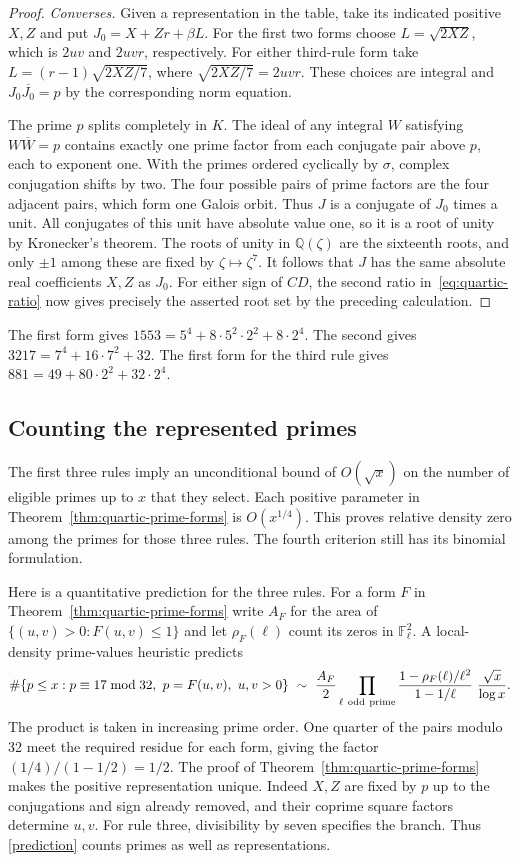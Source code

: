 \documentclass[11pt]{article}
\newcommand{\F}{\mathbb F}
\begin{document}
\begin{proof}
\smallskip\noindent
\emph{Converses.}
Given a representation in the table, take its indicated positive
$X,Z$ and put $J_0=X+Zr+\beta L$. For the first two forms choose
$L=\sqrt{2XZ}$, which is $2uv$ and $2uvr$, respectively.
For either third-rule form take $L=(r-1)\sqrt{2XZ/7}$, where
$\sqrt{2XZ/7}=2uvr$. These choices are integral and
$J_0\overline{J_0}=p$ by the corresponding norm equation.

The prime $p$ splits completely in $K$. The ideal of any integral
$W$ satisfying $W\overline W=p$ contains exactly one prime factor
from each conjugate pair above $p$, each to exponent one.
With the primes ordered cyclically by $\sigma$, complex conjugation
shifts by two. The four possible pairs of prime factors are the four
adjacent pairs, which form one Galois orbit. Thus $J$ is a conjugate
of $J_0$ times a unit. All conjugates of this unit have absolute
value one, so it is a root of unity by Kronecker's theorem.
The roots of unity in $\mathbb Q(\zeta)$ are the sixteenth roots,
and only $\pm1$ among these are fixed by $\zeta\mapsto\zeta^7$.
It follows that $J$ has the same absolute real coefficients $X,Z$
as $J_0$. For either sign of $CD$, the second ratio
in~\eqref{eq:quartic-ratio} now gives precisely the asserted root
set by the preceding calculation.
\end{proof}

The first form gives $1553=5^4+8\cdot5^2\cdot2^2+8\cdot2^4$.
The second gives $3217=7^4+16\cdot7^2+32$.
The first form for the third rule gives $881=49+80\cdot2^2+32\cdot2^4$.


\subsection*{Counting the represented primes}
The first three rules imply an unconditional bound of $O(\sqrt{x})$ on the number of eligible primes up to $x$ that they select. Each positive parameter in Theorem~\ref{thm:quartic-prime-forms} is $O(x^{1/4})$. This proves relative density zero among the primes for those three rules. The fourth criterion still has its binomial formulation.

Here is a quantitative prediction for the three rules. For a form $F$ in Theorem~\ref{thm:quartic-prime-forms} write $A_F$ for the area of $\{(u,v)>0:F(u,v)\le1\}$ and let $\rho_F(\ell)$ count its zeros in $\F_\ell^2$. A local-density prime-values heuristic predicts
\begin{equation}\label{prediction}
 \#\{p\le x:p\equiv17\bmod32,\ p=F(u,v),\ u,v>0\}
 \ \sim\ \frac{A_F}{2}\prod_{\ell\ {\rm odd\ prime}}
 \frac{1-\rho_F(\ell)/\ell^2}{1-1/\ell}\ \frac{\sqrt{x}}{\log x}.
\end{equation}
The product is taken in increasing prime order. One quarter of the pairs modulo 32 meet the required residue for each form, giving the factor $(1/4)/(1-1/2)=1/2$. The proof of Theorem~\ref{thm:quartic-prime-forms} makes the positive representation unique. Indeed $X,Z$ are fixed by $p$ up to the conjugations and sign already removed, and their coprime square factors determine $u,v$. For rule three, divisibility by seven specifies the branch. Thus \eqref{prediction} counts primes as well as representations.
\end{document}
